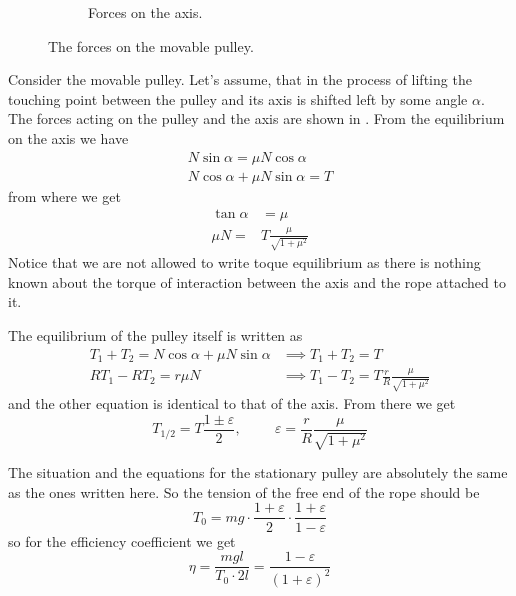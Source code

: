 \begin{figure}
\begin{subfigure}[l]{.29\textwidth}
        \caption{Forces on the axis.}
    \end{subfigure}
    
    \caption{The forces on the movable pulley.}
    \vspace{-1cm}
\end{figure}

Consider the movable pulley.
Let's assume, that in the process of lifting
the touching point between the pulley and its axis
is shifted left by some angle $\alpha$.
The forces acting on the pulley and the axis are shown in .
From the equilibrium on the axis we have
\begin{equation}
\begin{split}
    N \sin{\alpha} = \mu N \cos{\alpha} \\
    N \cos{\alpha} + \mu N \sin{\alpha} = T
\end{split}
\end{equation}
from where we get
\begin{equation}
\begin{split}
    \tan{\alpha} &= \mu \\
    \mu N = &T \frac{\mu}{\sqrt{1 + \mu^2}}
\end{split}
\end{equation}
Notice that we are not allowed to write toque equilibrium
as there is nothing known about the torque of interaction
between the axis and the rope attached to it.

The equilibrium of the pulley itself is written as
\begin{equation}
\begin{split}
    T_1 + T_2 = N \cos{\alpha} + \mu N \sin{\alpha} &\implies T_1 + T_2 = T \\
    R T_1 - R T_2 = r \mu N &\implies T_1 - T_2 = T \frac{r}{R} \frac{\mu}{\sqrt{1 + \mu^2}}
\end{split}
\end{equation}
and the other equation is identical to that of the axis.
From there we get
\begin{equation}
    T_{1/2} = T \frac{1 \pm \varepsilon}{2} , \hspace{1cm}
    \varepsilon = \frac{r}{R} \frac{\mu}{\sqrt{1 + \mu^2}}
\end{equation}

The situation and the equations for the stationary pulley
are absolutely the same as the ones written here.
So the tension of the free end of the rope should be
\begin{equation}
    T_0 = mg \cdot \frac{1+\varepsilon}{2} \cdot \frac{1+\varepsilon}{1-\varepsilon}
\end{equation}
so for the efficiency coefficient we get
\begin{equation}
    \eta = \frac{mg l}{T_0 \cdot 2l} = \frac{1 - \varepsilon}{(1 + \varepsilon)^2}
\end{equation}
